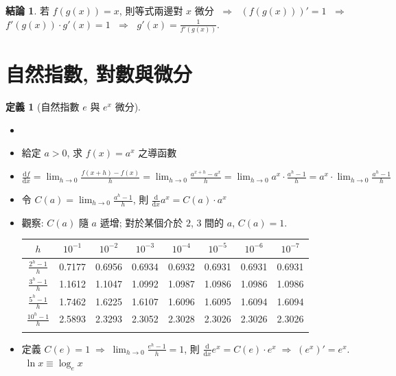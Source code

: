 \documentclass[12pt,a4paper]{extarticle}
\newcommand{\ds}{\displaystyle}
\newcommand{\ie}{\;\Longrightarrow\;}
\theoremstyle{definition}
\newtheorem*{dfn}{定義}
\newtheorem*{fact}{結論}
\newcommand{\diff}[2]{\frac{\mathrm{d} #1}{\mathrm{d} #2}}
\begin{document}
\begin{fact}
  若 $f(g(x)) = x$, 則等式兩邊對 $x$ 微分 $\ie$ $\ds(f(g(x)))' = 1$ $\ie$ $\ds f'(g(x))\cdot g'(x) = 1$ $\ie$ $\ds g'(x) = \frac{1}{f'(g(x))}$.   
\end{fact}

\section*{自然指數, 對數與微分}

\begin{dfn}[自然指數 $e$ 與 $e^x$ 微分]
  \begin{itemize}\setlength\itemsep{0em}
    \item[]
    \item 給定 $a > 0$, 求 $f(x) = a^x$ 之導函數
    \item $\ds\diff{f}{x}=\lim_{h \to 0} \frac{f(x+h) - f(x)}{h} = \lim_{h \to 0} \frac{a^{x+h} - a^x}{h} = \lim_{h \to 0} a^x \cdot \frac{a^{h} - 1}{h} = a^x \cdot \lim_{h \to 0} \frac{a^{h} - 1}{h}$
    \item 令 $\ds C(a) = \lim_{h \to 0} \frac{a^{h} - 1}{h}$, 則 $\ds\diff{}{x}a^x =  C(a)\cdot a^x$
    \item 觀察: $C(a)$ 隨 $a$ 遞增; 對於某個介於 $2$, $3$ 間的 $a$, $C(a) = 1$. 
      \begin{table}[!htbp]
        \centering
        \begin{tabular}{cccccccc}
        \toprule
        $h$ & $10^{-1}$ & $10^{-2}$ & $10^{-3}$ & $10^{-4}$ & $10^{-5}$ & $10^{-6}$ & $10^{-7}$ \\
        \midrule
        \addlinespace[1mm]
        $\ds\frac{2^h-1}{h}$ & 0.7177 & 0.6956 & 0.6934 & 0.6932 & 0.6931 & 0.6931 & 0.6931 \\
        \addlinespace[1mm]
        $\ds\frac{3^h-1}{h}$ & 1.1612 & 1.1047 & 1.0992 & 1.0987 & 1.0986 & 1.0986 & 1.0986 \\
        \addlinespace[1mm]
        $\ds\frac{5^h-1}{h}$ & 1.7462 & 1.6225 & 1.6107 & 1.6096 & 1.6095 & 1.6094 & 1.6094 \\
        \addlinespace[1mm]
        $\ds\frac{10^h-1}{h}$ & 2.5893 & 2.3293 & 2.3052 & 2.3028 & 2.3026 & 2.3026 & 2.3026 \\ 
        \addlinespace[1mm]
        \bottomrule
        \end{tabular}
      \end{table}
    \item 定義 $\ds C(e) = 1 \ie \lim_{h\to 0}\frac{e^h - 1}{h} = 1$, 則 $\ds\diff{}{x}e^x = C(e)\cdot e^x \ie (e^x)' = e^x$. $\ds\;\ln x \equiv\log_e x$
  \end{itemize}
\end{dfn}
\end{document}
